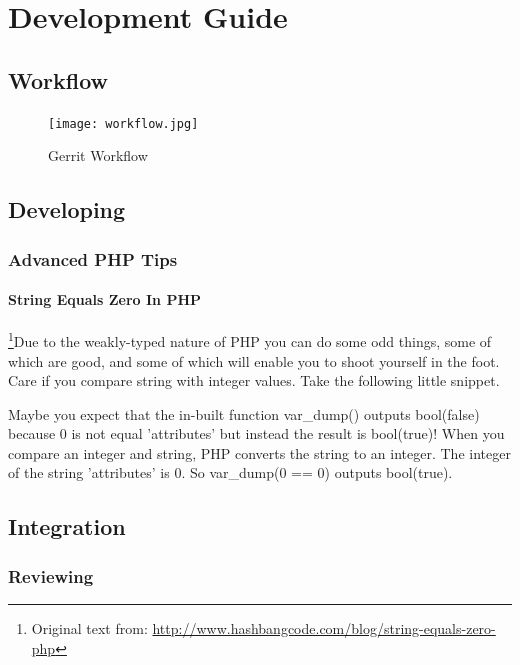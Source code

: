 \chapter{Development Guide}

\section{Workflow}

\begin{figure}[h] 
	\centering
	\texttt{[image: workflow.jpg]}
	\caption{Gerrit Workflow}
	\label{fig:gerrit-workflow}
\end{figure}

\section{Developing}

\subsection{Advanced PHP Tips}
\subsubsection{String Equals Zero In PHP}
\footnote{Original text from: \url{http://www.hashbangcode.com/blog/string-equals-zero-php}}Due to the weakly-typed nature of PHP you can do some odd things, some of which are good, and some of which will enable you to shoot yourself in the foot. Care if you compare string with integer values. Take the following little snippet.


Maybe you expect that the in-built function var\_dump() outputs bool(false) because 0 is not equal 'attributes' but instead the result is bool(true)! When you compare an integer and string, PHP converts the string to an integer. The integer of the string 'attributes' is 0. So var\_dump(0 == 0) outputs bool(true).

\section{Integration}

\subsection{Reviewing}

